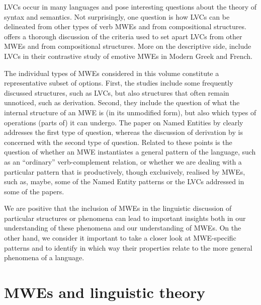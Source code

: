 \documentclass[output=paper]{langsci/langscibook}
\begin{document}
LVCs occur in many languages and pose interesting questions about the theory of syntax and semantics.  Not surprisingly, one question is how LVCs can be delineated from other types of verb MWEs and from compositional structures.  %
 offers a thorough discussion of the criteria used to set apart LVCs from other MWEs and from compositional structures.  More on the descriptive side,  
include LVCs in their contrastive study of emotive MWEs in Modern Greek and French.


The individual types of MWEs considered in this volume constitute a representative subset of options. First, the studies include some frequently  discussed structures, such as LVCs, but also structures that often remain unnoticed, such as derivation. Second, they include the question of what the internal structure of an MWE is (in its unmodified form), but also which types of operations (parts of) it can undergo. The paper on Named Entities by 
clearly addresses the first type of question, whereas the discussion of derivation by 
is concerned with the second type of question. Related to these points is the question of whether an MWE instantiates a general pattern of the language, such as an “ordinary” verb-complement relation, or whether we are dealing with a particular pattern that is productively, though exclusively, realised by MWEs, such as, maybe, some of the Named Entity patterns or the LVCs addressed in some of the papers.

We are positive that the inclusion of MWEs in the linguistic discussion of particular structures or phenomena can lead to important insights both in our understanding of these phenomena and our understanding of MWEs. On the other hand, we consider it important to take a closer look at MWE-specific patterns and to identify in which way their properties relate to the more general phenomena of a language. 




\section{MWEs and linguistic theory}
\label{Sec-LinguisticTheory} 
\end{document}
